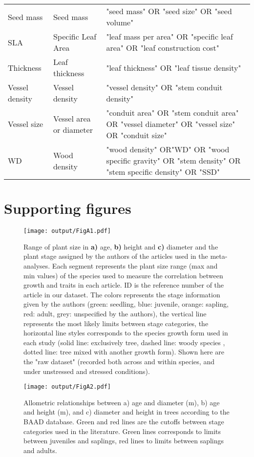 \documentclass[a4paper]{article}\usepackage[]{graphicx}\usepackage[]{color}
\begin{document}
\begin{appendices}
\begin{table}[ht]
\begin{tabular}{p{3cm}p{3cm}p{8cm}}
  Seed mass & Seed mass & "seed mass" OR "seed size" OR "seed volume" \\
  SLA & Specific Leaf Area & "leaf mass per area" OR "specific leaf area" OR "leaf construction cost" \\
  Thickness & Leaf thickness & "leaf thickness"  OR "leaf tissue density" \\
  Vessel density & Vessel density & "vessel density" OR "stem conduit density" \\
  Vessel size & Vessel area or diameter & "conduit area" OR "stem conduit area" OR "vessel diameter" OR "vessel size" OR "conduit size"   \\
  WD & Wood density & "wood density" OR"WD" OR "wood specific gravity" OR "stem density" OR "stem specific density" OR "SSD" \\
   \hline
\end{tabular}
\end{table}


\newpage
\section{Supporting figures}\label{app:supp_info_figures}

\begin{figure}[htbp]
\centering
\texttt{[image: output/FigA1.pdf]}
\caption{Range of plant size in \textbf{a)} age, \textbf{b)} height and \textbf{c)} diameter and the plant stage assigned by the authors of the articles used in the meta-analyses. Each segment represents the plant size range (max and min values) of the species used to measure the correlation between growth and traits in each article. ID is the reference number of the article in our dataset. The colors represents the stage information given by the authors (green: seedling, blue: juvenile, orange: sapling, red: adult, grey: unspecified by the authors), the vertical line represents the most likely limits between stage categories, the horizontal line styles corresponds to the species growth form used in each study (solid line: exclusively tree, dashed line: woody species , dotted line: tree mixed with another growth form). Shown here are the "raw dataset" (recorded both across and within species, and under unstressed and stressed conditions).}
\label{FigA1}
\end{figure}


\begin{figure}[htbp]
\centering
\texttt{[image: output/FigA2.pdf]}
\caption{Allometric relationships between a) age and diameter (m), b) age and height (m), and c) diameter and height in trees according to the BAAD database. Green and red lines are the cutoffs between stage categories used in the literature. Green lines corresponds to limits between juveniles and saplings, red lines to limits between saplings and adults.}
\label{FigA2}
\end{figure}



\end{appendices}
\end{document}
